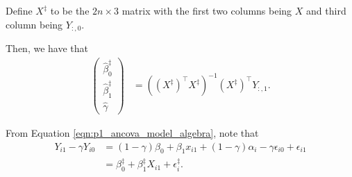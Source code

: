 \documentclass[letterpaper,11pt]{article}
\begin{document}
\begin{enumerate}
\begin{enumerate}
\begin{description}
\begin{description}
        Define $X^\ddagger$ to be the $2n \times 3$ matrix with the first two
        columns being $X$ and third column being $Y_{:,0}$.

        Then, we have that
        \begin{align}
          \begin{pmatrix}
            \hat{\beta}_0^\ddagger \\
            \hat{\beta}_1^\ddagger \\
            \hat{\gamma}            
          \end{pmatrix}
          &= \left(\left(X^\ddagger\right)^\intercal X^\ddagger\right)^{-1}
            \left(X^\ddagger\right)^\intercal Y_{:,1}.
          \label{eqn:p1_ancova_estimator}
        \end{align}

        From Equation \ref{eqn:p1_ancova_model_algebra}, note that
        \begin{align*}
          Y_{i1} - \gamma Y_{i0}          
          &=  \left(1 - \gamma\right)\beta_0 + \beta_1 x_{i1} +
            \left(1 - \gamma\right)\alpha_i - \gamma\epsilon_{i0} + \epsilon_{i1} \\
          &= \beta_0^\ddagger + \beta_1^\ddagger X_{i1} + \epsilon_{i}^\ddagger.
        \end{align*}


\end{description}
\end{description}
\end{enumerate}
\end{enumerate}
\end{document}
